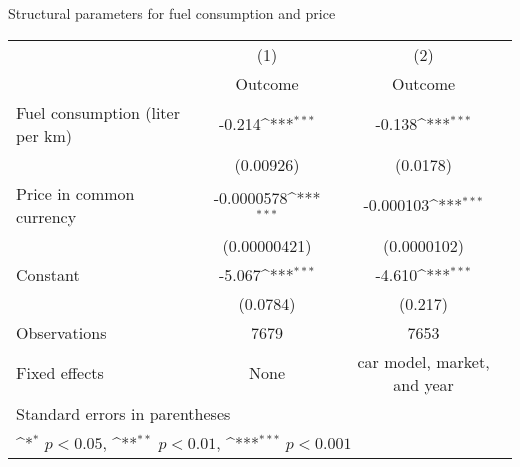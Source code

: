 {
\def\sym#1{\ifmmode^{#1}\else\(^{#1}\)\fi}
\caption{Structural parameters for fuel consumption and price \label{tab:2}}
\begin{tabular*}{\textwidth}{@{\hskip\tabcolsep\extracolsep\fill}l*{2}{c}}
\toprule
                    &\multicolumn{1}{c}{(1)}&\multicolumn{1}{c}{(2)}\\
                    &\multicolumn{1}{c}{Outcome}&\multicolumn{1}{c}{Outcome}\\
\midrule
Fuel consumption (liter per km)&      -0.214\sym{***}&      -0.138\sym{***}\\
                    &   (0.00926)         &    (0.0178)         \\
\addlinespace
Price in common currency&  -0.0000578\sym{***}&   -0.000103\sym{***}\\
                    &(0.00000421)         & (0.0000102)         \\
\addlinespace
Constant            &      -5.067\sym{***}&      -4.610\sym{***}\\
                    &    (0.0784)         &     (0.217)         \\
\midrule
Observations        &        7679         &        7653         \\
Fixed effects       &        None         &car model, market, and year         \\
\bottomrule
\multicolumn{3}{l}{\footnotesize Standard errors in parentheses}\\
\multicolumn{3}{l}{\footnotesize \sym{*} \(p<0.05\), \sym{**} \(p<0.01\), \sym{***} \(p<0.001\)}\\
\end{tabular*}
}
